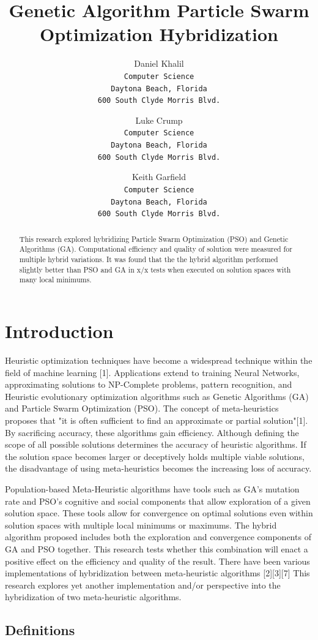 \documentclass[twocolumn]{article}
\title{Genetic Algorithm Particle Swarm Optimization Hybridization}
\author{Daniel Khalil
\\\texttt{Computer Science}
\\\texttt{Daytona Beach, Florida}
\\\texttt{600 South Clyde Morris Blvd.} \and
Luke Crump
\\\texttt{Computer Science}
\\\texttt{Daytona Beach, Florida}
\\\texttt{600 South Clyde Morris Blvd.} \and
Keith Garfield
\\\texttt{Computer Science}
\\\texttt{Daytona Beach, Florida}
\\\texttt{600 South Clyde Morris Blvd.}
}
\begin{document}
\maketitle
\begin{abstract}
This research explored hybridizing Particle Swarm Optimization (PSO) and Genetic Algorithms (GA). Computational efficiency and quality of solution were measured for multiple hybrid variations. It was found that the the hybrid algorithm performed slightly better than PSO and GA in x/x tests when executed on solution spaces with many local minimums.
\end{abstract}
\section{Introduction}
Heuristic optimization techniques have become a widespread technique within the field of machine learning [1]. Applications extend to training Neural Networks, approximating solutions to NP-Complete problems, pattern recognition, and Heuristic evolutionary optimization algorithms such as Genetic Algorithms (GA) and Particle Swarm Optimization (PSO). The concept of meta-heuristics proposes that "it is often sufficient to find an approximate or partial solution"[1]. By sacrificing accuracy, these algorithms gain efficiency. Although defining the scope of all possible solutions determines the accuracy of heuristic algorithms. If the solution space becomes larger or deceptively holds multiple viable solutions, the disadvantage of using meta-heuristics becomes the increasing loss of accuracy.

Population-based Meta-Heuristic algorithms have tools such as GA's mutation rate and PSO's cognitive and social components that allow exploration of a given solution space. These tools allow for convergence on optimal solutions even within solution spaces with multiple local minimums or maximums. The hybrid algorithm proposed includes both the exploration and convergence components of GA and PSO together. This research tests whether this combination will enact a positive effect on the efficiency and quality of the result. There have been various implementations of hybridization between meta-heuristic algorithms [2][3][7] This research explores yet another implementation and/or perspective into the hybridization of two meta-heuristic algorithms.

\subsection{Definitions}
\end{document}
